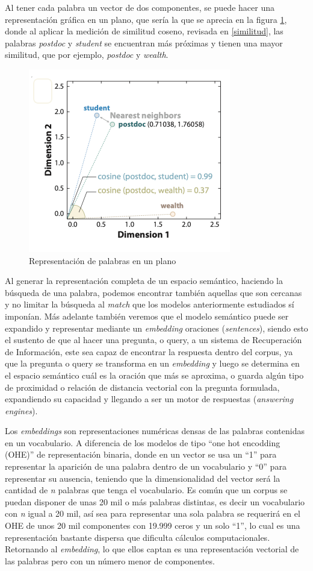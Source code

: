 \documentclass[
  10,
  openany]{book}
\begin{document}
Al tener cada palabra un vector de dos componentes, se puede hacer una representación gráfica en un plano, que sería la que se aprecia en la figura \ref{fig:embeddingimg}, donde al aplicar la medición de similitud coseno, revisada en \ref{similitud}, las palabras \emph{postdoc} y \emph{student} se encuentran más próximas y tienen una mayor similitud, que por ejemplo, \emph{postdoc} y \emph{wealth}.

\begin{figure}
\includegraphics[width=0.55\linewidth]{images/03-marco-teorico/word_vec} \caption{Representación de palabras en un plano}\label{fig:embeddingimg}
\end{figure}

Al generar la representación completa de un espacio semántico, haciendo la búsqueda de una palabra, podemos encontrar también aquellas que son cercanas y no limitar la búsqueda al \emph{match} que los modelos anteriormente estudiados sí imponían. Más adelante también veremos que el modelo semántico puede ser expandido y representar mediante un \emph{embedding} oraciones (\emph{sentences}), siendo esto el sustento de que al hacer una pregunta, o query, a un sistema de Recuperación de Información, este sea capaz de encontrar la respuesta dentro del corpus, ya que la pregunta o query se transforma en un \emph{embedding} y luego se determina en el espacio semántico cuál es la oración que más se aproxima, o guarda algún tipo de proximidad o relación de distancia vectorial con la pregunta formulada, expandiendo su capacidad y llegando a ser un motor de respuestas (\emph{answering engines}).~

Los \emph{embeddings} son representaciones numéricas densas de las palabras contenidas en un vocabulario. A diferencia de los modelos de tipo ``one hot encodding (OHE)'' de representación binaria, donde en un vector se usa un ``1'' para representar la aparición de una palabra dentro de un vocabulario y ``0'' para representar su ausencia, teniendo que la dimensionalidad del vector será la cantidad de \emph{n} palabras que tenga el vocabulario. Es común que un corpus se puedan disponer de unas 20 mil o más palabras distintas, es decir un vocabulario con \emph{n} igual a 20 mil, así sea para representar una sola palabra se requerirá en el OHE de unos 20 mil componentes con 19.999 ceros y un solo ``1'', lo cual es una representación bastante dispersa que dificulta cálculos computacionales. Retornando al \emph{embedding}, lo que ellos captan es una representación vectorial de las palabras pero con un número menor de componentes.
\end{document}
